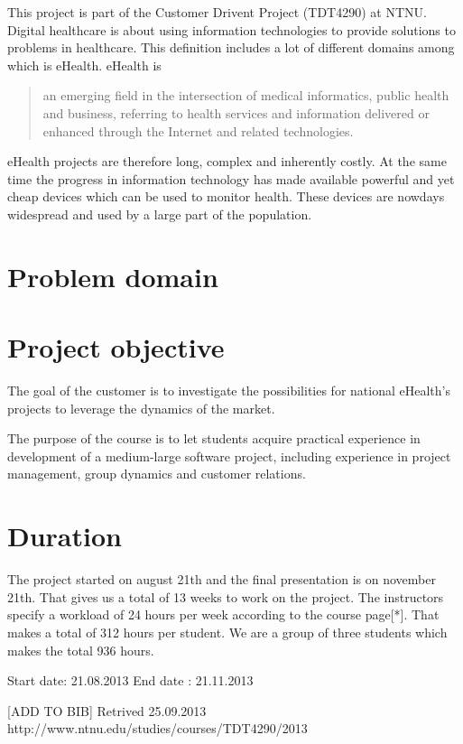 This project is part of the Customer Drivent Project (TDT4290) at NTNU.
Digital healthcare is about using information technologies to provide solutions to problems in healthcare. This definition includes a lot of different domains among which is eHealth. eHealth is
\begin{quote}
an emerging field in the intersection of medical informatics, public health and business, referring to health services and information delivered or enhanced through the Internet and related technologies.\citep{ehealth}
\end{quote}
eHealth projects are therefore long, complex and inherently costly. At the same time the progress in information technology has made available powerful and yet cheap devices which can be used to monitor health. These devices are nowdays widespread and used by a large part of the population.


\section{Problem domain}

\section{Project objective}

The goal of the customer is to investigate the possibilities for national eHealth's projects to leverage the dynamics of the market.

The purpose of the course is to let students acquire practical experience in development of a medium-large software project,
including experience in project management, group dynamics and customer relations.

\section{Duration}
The project started on august 21th and the final presentation is on november 21th. That gives us a total of 13 weeks to work on the project. The instructors specify a workload of 24 hours per week according to the course page[*]. That makes a total of 312 hours per student. We are a group of three students which makes the total 936 hours.

Start date: 21.08.2013
End date : 21.11.2013

[ADD TO BIB] Retrived 25.09.2013 http://www.ntnu.edu/studies/courses/TDT4290/2013
